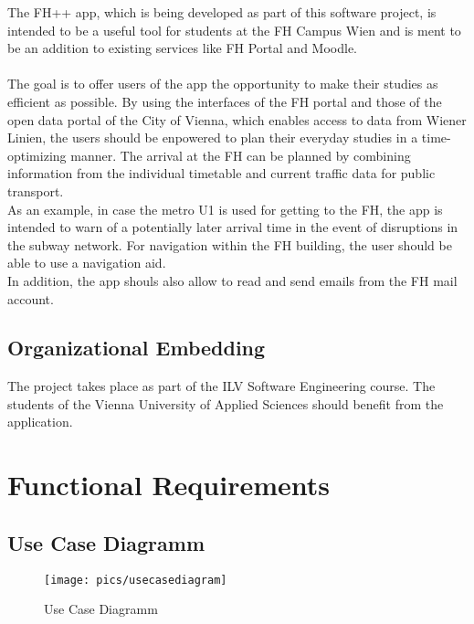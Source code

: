 \documentclass{scrreprt}
\begin{document}
The FH++ app, which is being developed as part of this software project, is intended to be a useful tool for students at the FH Campus Wien and is ment to be an addition to existing services like FH Portal and Moodle. \\ \\
The goal is to offer users of the app the opportunity to make their studies as efficient as possible.
By using the interfaces of the FH portal and those of the open data portal of the City of Vienna, which enables access to data from Wiener Linien,
the users should be enpowered to plan their everyday studies in a time-optimizing manner.
The arrival at the FH can be planned by combining information from the individual timetable and current traffic data for public transport. \\
As an example, in case the metro U1 is used for getting to the FH, the app is intended to warn of a potentially later arrival time in the event of disruptions in the subway network.
For navigation within the FH building, the user should be able to use a navigation aid. \\
In addition, the app shouls also allow to read and send emails from the FH mail account.

\section{Organizational Embedding}
The project takes place as part of the ILV Software Engineering course. The students of the Vienna University of Applied Sciences should benefit from the application.

\chapter{Functional Requirements}

\section{Use Case Diagramm}

\begin{figure} [h]
	\centering
	\texttt{[image: pics/usecasediagram]}
	\caption{Use Case Diagramm}
	\label{fig:usecasediagram}
\end{figure}
\end{document}
